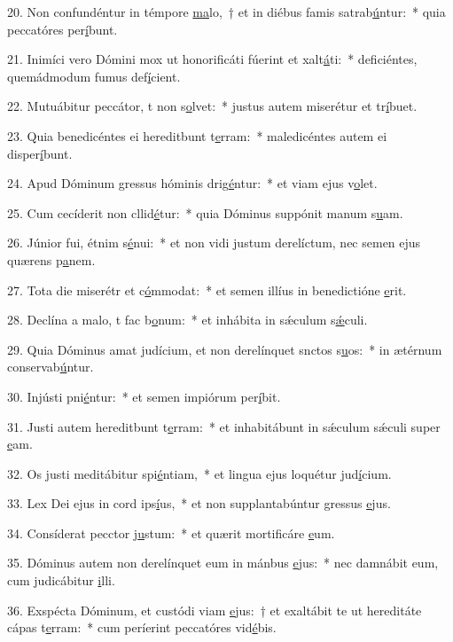 20. Non confundéntur in témpore \uline{ma}lo,~† et in diébus famis satrab\uline{ú}ntur:~* quia peccatóres per\uline{í}bunt.\par 
21. Inimíci vero Dómini mox ut honorificáti fúerint et xalt\uline{á}ti:~* deficiéntes, quemádmodum fumus def\uline{í}cient.\par 
22. Mutuábitur peccátor, t non s\uline{o}lvet:~* justus autem miserétur et tr\uline{í}buet.\par 
23. Quia benedicéntes ei hereditbunt t\uline{e}rram:~* maledicéntes autem ei disper\uline{í}bunt.\par 
24. Apud Dóminum gressus hóminis drig\uline{é}ntur:~* et viam ejus v\uline{o}let.\par 
25. Cum cecíderit non cllid\uline{é}tur:~* quia Dóminus suppónit manum s\uline{u}am.\par 
26. Júnior fui, étnim s\uline{é}nui:~* et non vidi justum derelíctum, nec semen ejus quærens p\uline{a}nem.\par 
27. Tota die miserétr et c\uline{ó}mmodat:~* et semen illíus in benedictióne \uline{e}rit.\par 
28. Declína a malo, t fac b\uline{o}num:~* et inhábita in sǽculum s\uline{ǽ}culi.\par 
29. Quia Dóminus amat judícium, et non derelínquet snctos s\uline{u}os:~* in ætérnum conservab\uline{ú}ntur.\par 
30. Injústi pni\uline{é}ntur:~* et semen impiórum per\uline{í}bit.\par 
31. Justi autem hereditbunt t\uline{e}rram:~* et inhabitábunt in sǽculum sǽculi super \uline{e}am.\par 
32. Os justi meditábitur spi\uline{é}ntiam,~* et lingua ejus loquétur jud\uline{í}cium.\par 
33. Lex Dei ejus in cord ips\uline{í}us,~* et non supplantabúntur gressus \uline{e}jus.\par 
34. Consíderat pecctor j\uline{u}stum:~* et quærit mortificáre \uline{e}um.\par 
35. Dóminus autem non derelínquet eum in mánbus \uline{e}jus:~* nec damnábit eum, cum judicábitur \uline{i}lli.\par 
36. Exspécta Dóminum, et custódi viam \uline{e}jus:~† et exaltábit te ut hereditáte cápas t\uline{e}rram:~* cum períerint peccatóres vid\uline{é}bis.\par 
